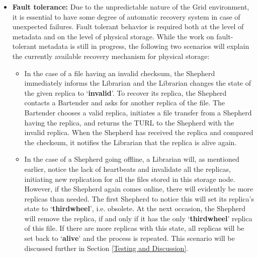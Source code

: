 \documentclass{llncs}
\begin{document}
\begin{itemize}

\item \textbf{Fault tolerance:} Due to the unpredictable nature of the Grid environment, it is essential to
have some degree of  automatic recovery system in case of unexpected
failures. Fault tolerant behavior is required both at the level of
metadata and on the level of physical storage. While the work on fault-tolerant metadata is still in
progress, the following two
scenarios will explain the currently available recovery mechanism for
physical storage: 
\begin{itemize}
\item In the case of a file having an invalid checksum, the Shepherd
immediately informs the Librarian and the Librarian changes the state of the given replica to
`\textbf{invalid}'. To recover its replica, the Shepherd contacts a
Bartender and asks for another replica of the file. The Bartender chooses a valid
replica, initiates a file transfer from a Shepherd having the replica,
and returns the TURL to the Shepherd with the invalid replica. When the
Shepherd has received the replica and compared the checksum, it notifies the
Librarian that the replica is alive again.  
\item In the case of a Shepherd going offline, a Librarian will,
  as mentioned earlier, notice the lack of heartbeats and invalidate all the
  replicas, initiating new replication for all the files stored in
  this storage node. However, if the Shepherd
  again comes online, there will evidently be more replicas than
  needed. The first Shepherd to notice this will set its replica's
  state to `\textbf{thirdwheel}', i.e. obsolete. At the next occasion,
  the Shepherd will remove the replica, if and only if it has the only
  `\textbf{thirdwheel}' replica of this file. If there are more
  replicas with this state, all replicas will be set back to
  `\textbf{alive}' and the process is repeated. This scenario will be discussed further in Section
  \ref{Testing and Discussion}.
\end{itemize}



\end{itemize}
\end{document}
